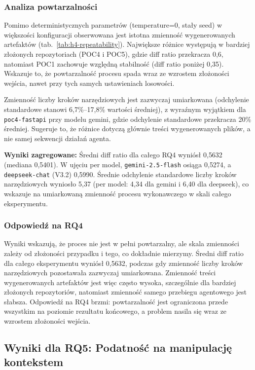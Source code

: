 \subsubsection{Analiza powtarzalności}

Pomimo deterministycznych parametrów (temperature=0, stały seed) w większości konfiguracji obserwowana jest istotna zmienność wygenerowanych artefaktów (tab.~\ref{tab:h4-repeatability}). Największe różnice występują w bardziej złożonych repozytoriach (POC4 i POC5), gdzie diff ratio przekracza 0{,}6, natomiast POC1 zachowuje względną stabilność (diff ratio poniżej 0{,}35). Wskazuje to, że powtarzalność procesu spada wraz ze wzrostem złożoności wejścia, nawet przy tych samych ustawieniach losowości.

Zmienność liczby kroków narzędziowych jest zazwyczaj umiarkowana (odchylenie standardowe stanowi 6{,}7\%--17{,}8\% wartości średniej), z wyraźnym wyjątkiem dla \texttt{poc4-fastapi} przy modelu gemini, gdzie odchylenie standardowe przekracza 20\% średniej. Sugeruje to, że różnice dotyczą głównie treści wygenerowanych plików, a nie samej sekwencji działań agenta.

\textbf{Wyniki zagregowane:} Średni diff ratio dla całego RQ4 wyniósł 0{,}5632 (mediana 0{,}5401). W ujęciu per model, \texttt{gemini-2.5-flash} osiąga 0{,}5274, a \texttt{deepseek-chat} (V3.2) 0{,}5990. Średnie odchylenie standardowe liczby kroków narzędziowych wyniosło 5{,}37 (per model: 4{,}34 dla gemini i 6{,}40 dla deepseek), co wskazuje na umiarkowaną zmienność procesu wykonawczego w skali całego eksperymentu.

\subsubsection{Odpowiedź na RQ4}

Wyniki wskazują, że proces nie jest w pełni powtarzalny, ale skala zmienności zależy od złożoności przypadku i tego, co dokładnie mierzymy. Średni diff ratio dla całego eksperymentu wyniósł 0{,}5632, podczas gdy zmienność liczby kroków narzędziowych pozostawała zazwyczaj umiarkowana. Zmienność treści wygenerowanych artefaktów jest więc często wysoka, szczególnie dla bardziej złożonych repozytoriów, natomiast zmienność samego przebiegu agentowego jest słabsza. Odpowiedź na RQ4 brzmi: powtarzalność jest ograniczona przede wszystkim na poziomie rezultatu końcowego, a problem nasila się wraz ze wzrostem złożoności wejścia.

\subsection{Wyniki dla RQ5: Podatność na manipulację kontekstem}

